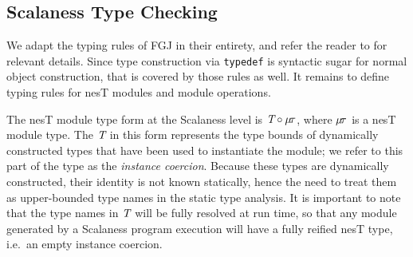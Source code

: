 \subsection{Scalaness Type Checking}
\label{section-typing}

\scalanesstypingfig
We adapt the
typing rules of FGJ in their entirety, and refer the reader to
\cite{FJ} for relevant details. Since type construction via 
\texttt{typedef} is syntactic sugar for normal object construction, 
that is covered by those rules as well. It remains to define typing 
rules for nesT modules and module operations.


The nesT module type form at the Scalaness level is
$\textit{T} \circ \mu\!\tau$, where $\mu\!\tau$ is a nesT module
type. The $\textit{T}$ in this form represents the type bounds of
dynamically constructed types that have been used to instantiate the
module; we refer to this part of the type as the \emph{instance
  coercion}. Because these types are dynamically constructed, their
identity is not known statically, hence the need to treat them as
upper-bounded type names in the static type analysis. It is important
to note that the type names in $\textit{T}$ will be fully resolved at
run time, so that any module generated by a Scalaness program
execution will have a fully reified nesT type, i.e.~an empty instance
coercion.

